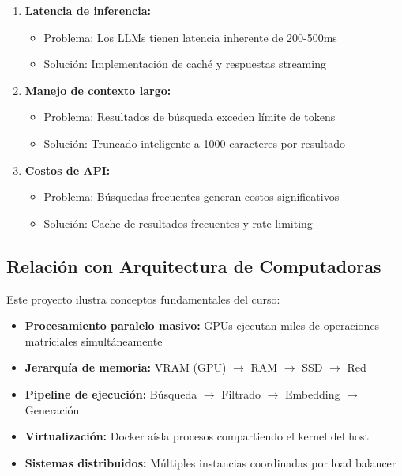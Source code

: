 \documentclass[12pt,a4paper]{article}
\begin{document}
\begin{enumerate}
    \item \textbf{Latencia de inferencia:}
    \begin{itemize}
        \item Problema: Los LLMs tienen latencia inherente de 200-500ms
        \item Solución: Implementación de caché y respuestas streaming
    \end{itemize}

    \item \textbf{Manejo de contexto largo:}
    \begin{itemize}
        \item Problema: Resultados de búsqueda exceden límite de tokens
        \item Solución: Truncado inteligente a 1000 caracteres por resultado
    \end{itemize}

    \item \textbf{Costos de API:}
    \begin{itemize}
        \item Problema: Búsquedas frecuentes generan costos significativos
        \item Solución: Cache de resultados frecuentes y rate limiting
    \end{itemize}
\end{enumerate}

\subsection{Relación con Arquitectura de Computadoras}

Este proyecto ilustra conceptos fundamentales del curso:

\begin{itemize}
    \item \textbf{Procesamiento paralelo masivo:} GPUs ejecutan miles de operaciones matriciales simultáneamente
    \item \textbf{Jerarquía de memoria:} VRAM (GPU) $\rightarrow$ RAM $\rightarrow$ SSD $\rightarrow$ Red
    \item \textbf{Pipeline de ejecución:} Búsqueda $\rightarrow$ Filtrado $\rightarrow$ Embedding $\rightarrow$ Generación
    \item \textbf{Virtualización:} Docker aísla procesos compartiendo el kernel del host
    \item \textbf{Sistemas distribuidos:} Múltiples instancias coordinadas por load balancer
\end{itemize}
\end{document}
